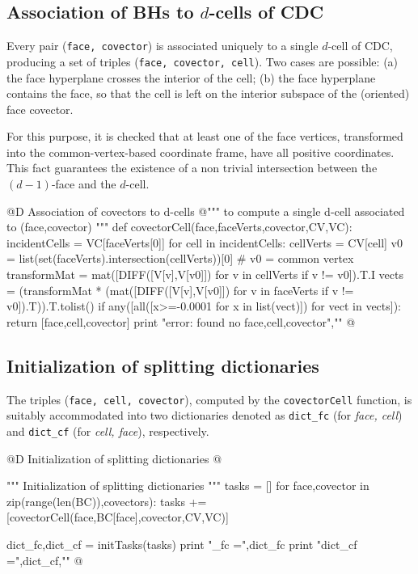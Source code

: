 \documentclass[11pt,oneside]{article}	%
\begin{document}
\subsection{Association of BHs to $d$-cells of CDC}

Every pair (\texttt{face, covector}) is associated uniquely to a single $d$-cell of CDC, producing a set of triples (\texttt{face, covector, cell}). Two cases are possible: (a) the face hyperplane crosses the interior of the cell; (b) the face hyperplane contains the face, so that the cell is left on the interior subspace of the (oriented) face covector.

For this purpose, it is checked that at least one of the face vertices, transformed into the common-vertex-based coordinate frame, have all positive coordinates. This fact guarantees the existence of a non trivial intersection between the $(d-1)$-face and the $d$-cell.


@D Association of covectors to d-cells
@{""" to compute a single d-cell associated to (face,covector) """
def covectorCell(face,faceVerts,covector,CV,VC):
	incidentCells = VC[faceVerts[0]]
	for cell in incidentCells:
		cellVerts = CV[cell]
		v0 = list(set(faceVerts).intersection(cellVerts))[0] # v0 = common vertex
		transformMat = mat([DIFF([V[v],V[v0]]) for v in cellVerts if v != v0]).T.I
		vects = (transformMat * (mat([DIFF([V[v],V[v0]]) for v in faceVerts 
					if v != v0]).T)).T.tolist()
		if any([all([x>=-0.0001 for x in list(vect)]) for vect in vects]): 
			return [face,cell,covector]
	print "error: found no face,cell,covector","\n"
@}




\subsection{Initialization of splitting dictionaries}
The triples (\texttt{face, cell, covector}), computed by the \texttt{covectorCell} function, is suitably accommodated into two dictionaries denoted as \texttt{dict\_fc} (for \emph{face, cell}) and \texttt{dict\_cf} (for \emph{cell, face}), respectively.


@D Initialization of splitting dictionaries
@{""" Initialization of splitting dictionaries """
tasks = []
for face,covector in zip(range(len(BC)),covectors):
	tasks += [covectorCell(face,BC[face],covector,CV,VC)]

dict_fc,dict_cf = initTasks(tasks)
print "\ndict_fc =",dict_fc
print "dict_cf =",dict_cf,"\n"
@}
\end{document}
